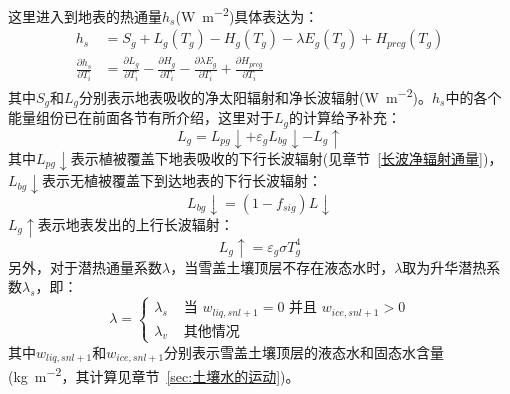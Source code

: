 这里进入到地表的热通量$h_s$(\unit{W.m^{-2}})具体表达为：
\begin{equation}
\begin{aligned}
h_{s} &= S_{g}+L_{g}\left(T_{g}\right)-H_{g}\left(T_{g}\right)-\lambda E_{g}\left(T_{g}\right)+H_{p r c g}\left(T_{g}\right) \\
\frac{\partial h_{s}}{\partial T_{i}} &= \frac{\partial L_{g}}{\partial T_{i}}-\frac{\partial H_{g}}{\partial T_{i}}-\frac{\partial \lambda E_{g}}{\partial T_{i}}+\frac{\partial H_{p r c g}}{\partial T_{i}}
\end{aligned}
\end{equation}
其中$S_g$和$L_g$分别表示地表吸收的净太阳辐射和净长波辐射(\unit{W.m^{-2}})。$h_s$中的各个能量组份已在前面各节有所介绍，这里对于$L_g$的计算给予补充：
\begin{equation}
L_{g}=L_{p g} \downarrow+\varepsilon_{g} L_{b g} \downarrow-L_{g} \uparrow
\end{equation}
其中$L_{pg}\downarrow$表示植被覆盖下地表吸收的下行长波辐射(见章节~\ref{长波净辐射通量})，$L_{bg}\downarrow$表示无植被覆盖下到达地表的下行长波辐射：
\begin{equation}
L_{b g} \downarrow=\left(1-f_{ sig }\right) L \downarrow
\end{equation}
$L_g\uparrow$表示地表发出的上行长波辐射：
\begin{equation}
L_{g} \uparrow=\varepsilon_{g} \sigma T_{g}^{4}
\end{equation}
另外，对于潜热通量系数$\lambda$，当雪盖土壤顶层不存在液态水时，$\lambda$取为升华潜热系数$\lambda_s$，即：
\begin{equation}
\lambda=\left\{\begin{array}{lr}\lambda_{s} & \text { 当 } w_{liq, s n l+1}=0 \text { 并且 } w_{ice, s n l+1}>0 \\ \lambda_{v} & \text { 其他情况 }\end{array}\right.
\end{equation}
其中$w_{liq,snl+1}$和$w_{ice,snl+1}$分别表示雪盖土壤顶层的液态水和固态水含量 (\unit{kg.m^{-2}}，其计算见章节~\ref{sec:土壤水的运动})。

